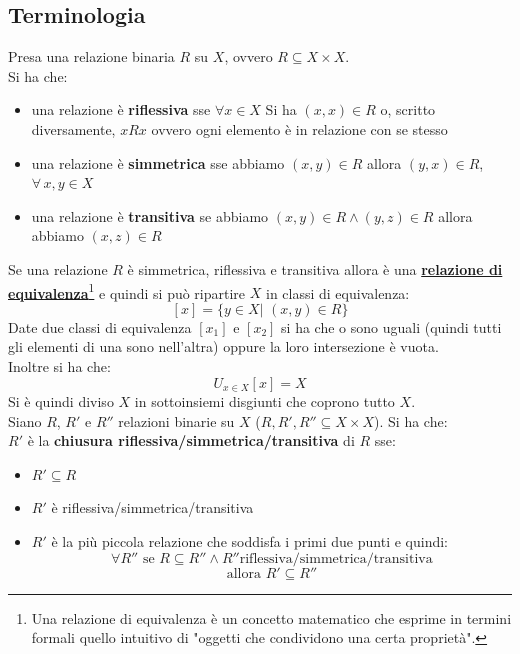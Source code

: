 \subsection{Terminologia}
\begin{shaded}
  Presa una relazione binaria $R$ su $X$, ovvero $R\subseteq X\times X$.\\
  Si ha che:
  \begin{itemize}
    \item una relazione è \textbf{riflessiva} sse $\forall x\in X$ Si ha
    $(x, x)\in R$ o, scritto diversamente, $xRx$ ovvero ogni elemento è in
    relazione con se stesso 
    \item una relazione è \textbf{simmetrica} sse abbiamo $(x, y)\in R$ allora
    $(y, x)\in R$, $\forall\, x, y\in X$
    \item una relazione è \textbf{transitiva} se abbiamo $(x, y)\in R\land (y, z)\in R$
    allora abbiamo $(x, z)\in R$
  \end{itemize}
  Se una relazione $R$ è simmetrica, riflessiva e transitiva allora è una
   \href{https://it.wikipedia.org/wiki/Relazione_di_equivalenza}{\textbf{relazione di equivalenza}}\footnote{Una relazione di equivalenza è un concetto matematico che esprime in termini formali quello intuitivo di "oggetti che condividono una certa proprietà".} e quindi si può ripartire $X$ in classi di
  equivalenza:
  \[[x]=\{y\in X|\,\,(x, y)\in R\}\]
  Date due classi di equivalenza $[x_1]$ e $[x_2]$ si ha che o sono uguali
  (quindi tutti gli elementi di una sono nell'altra) oppure la loro intersezione
  è vuota.\\
  Inoltre si ha che:
  \[U_{x\in X}[x]=X\]
  Si è quindi diviso $X$ in sottoinsiemi disgiunti che coprono tutto $X$.\\
  Siano $R$, $R'$ e $R''$ relazioni binarie su $X$ ($R, R', R'' \subseteq X \times X$). Si ha che:\\
  $R'$ è la \textbf{chiusura riflessiva/simmetrica/transitiva} di
  $R$ sse: 
  \begin{itemize}
    \item $R'\subseteq R$
    \item $R'$ è riflessiva/simmetrica/transitiva
    \item $R'$ è la più piccola relazione che soddisfa i primi due punti e
    quindi:
    \[\forall R''\mbox{ se }R\subseteq R''\land
      R''\mbox{riflessiva/simmetrica/transitiva}\]
    \[\mbox{allora } R'\subseteq R''\]
  \end{itemize}
\end{shaded}
